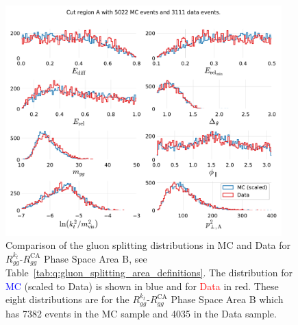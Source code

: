 \begin{figure}[h!]
  \centerfloat
  \includegraphics[width=0.95\textwidth, trim=0 0 0 0, clip, page=2]{figures/quarks/gtag-R_kt_CA_histograms-down_sample=1.00-ML_vars=vertex-selection=b-ejet_min=4-n_iter_RS_lgb=99-n_iter_RS_xgb=9-cdot_cut=0.90-version=19-njet=4.pdf}
  \caption[Gluon Splitting Distribution Comparison in MC and Data for $R_{gg}^{k_t}$-$R_{gg}^\mathrm{CA}$ Phase Space Area B]
          {Comparison of the gluon splitting distributions in MC and Data for $R_{gg}^{k_t}$-$R_{gg}^\mathrm{CA}$ Phase Space Area B, see Table~\ref{tab:q:gluon_splitting_area_definitions}. The distribution for \textcolor{blue}{MC} (scaled to Data) is shown in blue and for \textcolor{red}{Data} in red. These eight distributions are for the $R_{gg}^{k_t}$-$R_{gg}^\mathrm{CA}$ Phase Space Area B which has \num{7382} events in the MC sample and \num{4035} in the Data sample. } 
  \label{fig:q:R_kt_CA_cut_B}
\end{figure}

